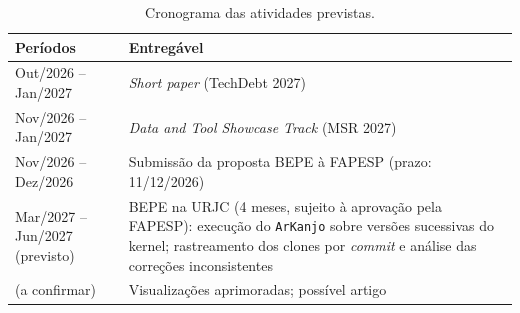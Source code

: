 \documentclass[oneside]{abntlatex}
\begin{document}
\begin{table}[htbp]
\centering
\caption{Cronograma das atividades previstas.}\label{tab:cronograma}
\begin{tabularx}{\textwidth}{X X}
\toprule
\textbf{Períodos} & \textbf{Entregável} \\
\midrule
Out/2026 -- Jan/2027 & \textit{Short paper} (TechDebt 2027) \\
Nov/2026 -- Jan/2027 & \textit{Data and Tool Showcase Track} (MSR 2027) \\
Nov/2026 -- Dez/2026 & Submissão da proposta BEPE à FAPESP (prazo: 11/12/2026) \\
Mar/2027 -- Jun/2027 (previsto) & BEPE na URJC (4 meses, sujeito à aprovação pela FAPESP): execução do \texttt{ArKanjo} sobre versões sucessivas do kernel; rastreamento dos clones por \textit{commit} e análise das correções inconsistentes \\
(a confirmar) & Visualizações aprimoradas; possível artigo \\
\bottomrule
\end{tabularx}
\end{table}

\cleardoublepage
\backtext
% 
\begingroup
\small

\endgroup
\end{document}
